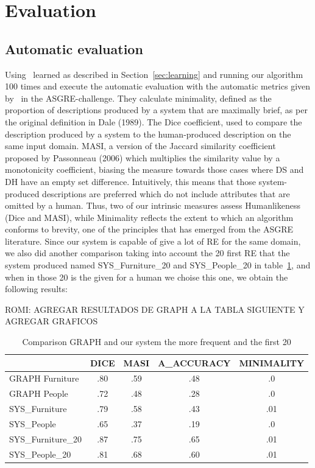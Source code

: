 \section{Evaluation} \label{sec:automaticeval}

\subsection{Automatic evaluation}

Using \puse~learned as described in Section~\ref{sec:learning} and running our algorithm 100 times and execute the automatic evaluation with the automatic metrics given by~\cite{} in the ASGRE-challenge.
They calculate minimality, defined as the proportion of descriptions produced by a system
that are maximally brief, as per the original definition in Dale (1989). The Dice coefficient, used to compare the description produced by a system to the human-produced description on the same input domain. %
MASI, a version of the Jaccard similarity coefficient proposed
by Passonneau (2006) which multiplies the similarity value by a monotonicity coefficient, biasing
the measure towards those cases where DS and
DH have an empty set difference. Intuitively, this
means that those system-produced descriptions are
preferred which do not include attributes that are
omitted by a human. Thus, two of our intrinsic measures assess Humanlikeness (Dice and MASI), while
Minimality reflects the extent to which an algorithm
conforms to brevity, one of the principles that has
emerged from the ASGRE literature.
Since our system is capable of give a lot of RE for the same domain, we also did another comparison taking into account the 20 first RE that the system produced named SYS\_Furniture\_20 and SYS\_People\_20 in table~\ref{Tabla_sis_1_20}, and when in those 20 is the given for a human we choise this one, we obtain the following results:

ROMI: AGREGAR RESULTADOS DE GRAPH A LA TABLA SIGUIENTE Y AGREGAR GRAFICOS

\begin{table}[h!]
\begin{center}
\begin{tabular}{|l|c|c|c|c|}
\hline
	 	& 	DICE		&	MASI	&	A\_ACCURACY	&MINIMALITY	\\
\hline
GRAPH Furniture	& 	.80 		&	.59	&	.48		&	.0 	\\
GRAPH People 	& 	.72		&	.48	&	.28		&	.0	\\
\hline
SYS\_Furniture	&	.79		&	.58	&	.43		&	.01	\\
SYS\_People	&	.65		&	.37	&	.19		&	.0	\\
\hline
SYS\_Furniture\_20	&	.87		&	.75  	&	.65		&	.01	\\
SYS\_People\_20	&	.81		&	.68	&	.60		&	.01	\\
\hline
\end{tabular}
\caption{Comparison GRAPH and our system the more frequent and the first 20}
\label{Tabla_sis_1_20}
\end{center}
\end{table}

